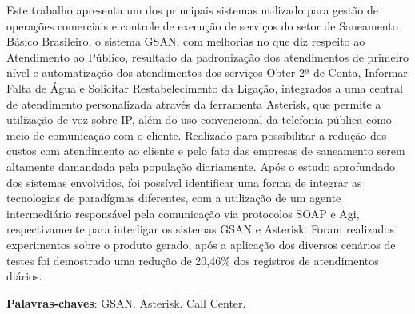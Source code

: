 \begin{resumo}
Este trabalho apresenta um dos principais sistemas utilizado para gestão de operações comerciais e controle de execução de serviços do setor de Saneamento Básico Brasileiro, o sistema GSAN, com melhorias no que diz respeito ao Atendimento ao Público, resultado da padronização dos atendimentos de primeiro nível e automatização dos atendimentos dos serviços Obter 2ª de Conta, Informar Falta de Água e Solicitar Restabelecimento da Ligação, integrados a uma central de atendimento personalizada através da ferramenta Asterisk, que permite a utilização de voz sobre IP, além do uso convencional da telefonia pública como meio de comunicação com o cliente. Realizado para possibilitar a redução dos custos com atendimento ao cliente e pelo fato das empresas de saneamento serem altamente damandada pela população diariamente. Após o estudo aprofundado dos sistemas envolvidos, foi possível identificar uma forma de integrar as tecnologias de paradígmas diferentes, com a utilização de um agente intermediário responsável pela comunicação via protocolos SOAP e Agi, respectivamente para interligar os sistemas GSAN e Asterisk.  Foram realizados experimentos sobre o produto gerado, após a aplicação dos diversos cenários de testes foi demostrado uma redução de 20,46\% dos registros de atendimentos diários.

 \vspace{\onelineskip}
    
 \noindent
 \textbf{Palavras-chaves}: GSAN. Asterisk. Call Center.
\end{resumo}
